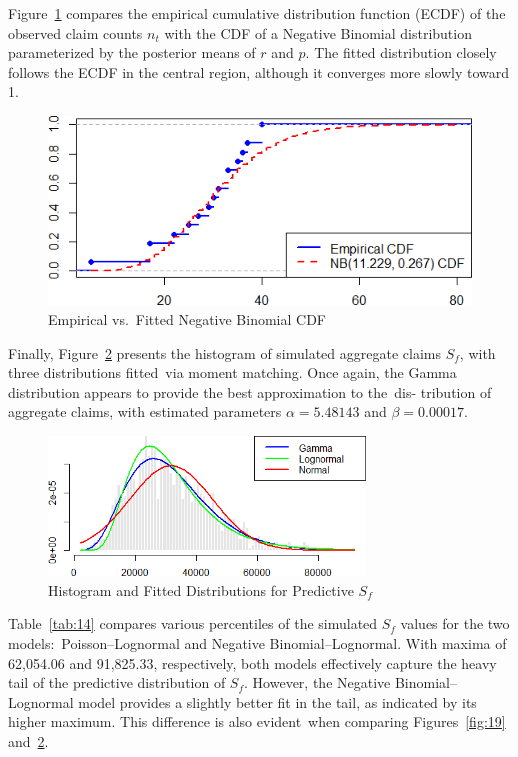 \documentclass{Class/julia}
\begin{document}
Figure~\ref{fig:22} compares the empirical cumulative distribution function (ECDF) of the observed claim counts \( n_t \) with the CDF of a Negative Binomial distribution parameterized by the posterior means of \( r \) and \( p \). The fitted distribution closely follows the ECDF in the central region, although it converges more slowly toward 1.

\begin{figure}[!ht]
    \centering
    \caption{Empirical vs.\ Fitted Negative Binomial CDF}
    \label{fig:22}
    \includegraphics[width=.75\textwidth]{itamtplcost_nb/empirical_vs_nb.png}
\end{figure}

Finally, Figure~\ref{fig:23} presents the histogram of simulated aggregate claims \( S_f \), with three distributions fitted~via moment matching. Once again, the Gamma distribution appears to provide the best approximation to the~dis- tribution of aggregate claims, with estimated parameters \( \alpha = 5.48143 \) and \( \beta = 0.00017 \).

\begin{figure}[!ht]
\centering
\caption{Histogram and Fitted Distributions for Predictive \( S_f \)}
\label{fig:23}
\includegraphics[width=0.75\textwidth]{itamtplcost_nb/predictive_S_f.png}
\end{figure}

Table~\ref{tab:14} compares various percentiles of the simulated \( S_f \) values for the two models:\ Poisson--Lognormal and Negative Binomial--Lognormal. With maxima of 62{,}054.06 and 91{,}825.33, respectively, both models effectively capture the heavy tail of the predictive distribution of \( S_f \). However, the Negative Binomial--Lognormal model provides a slightly better fit in the tail, as indicated by its higher maximum. This difference is also evident~when comparing Figures~\ref{fig:19} and~\ref{fig:23}.
\end{document}
